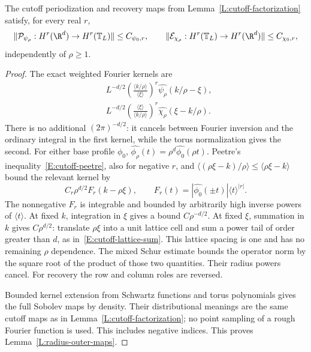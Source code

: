 \begin{lemma}\label{L:radius-outer-maps}
  The cutoff periodization and recovery maps from
  Lemma~\ref{L:cutoff-factorization} satisfy, for every real $r$,
  \[
    \|\mathcal P_{\psi_\rho}:H^r(\R^d)\to H^r(\mathbb T_L)\|
    \le C_{\psi_0,r},\qquad
    \|\mathcal E_{\chi_\rho}:H^r(\mathbb T_L)\to H^r(\R^d)\|
    \le C_{\chi_0,r},
  \]
  independently of $\rho\ge1$.
\end{lemma}

\begin{proof}
  The exact weighted Fourier kernels are
  \begin{align*}
    &L^{-d/2}
    \left(\frac{\langle k/\rho\rangle}{\langle\xi\rangle}\right)^r
    \widehat{\psi_\rho}(k/\rho-\xi),\\
    &L^{-d/2}
    \left(\frac{\langle\xi\rangle}{\langle k/\rho\rangle}\right)^r
    \widehat{\chi_\rho}(\xi-k/\rho).
  \end{align*}
  There is no additional $(2\pi)^{-d/2}$: it cancels between
  Fourier inversion and the ordinary integral in the first kernel,
  while the torus normalization gives the second.
  For either base profile $\phi_0$,
  $\widehat{\phi_\rho}(t)=\rho^d\widehat{\phi_0}(\rho t)$.
  Peetre's inequality~\eqref{E:cutoff-peetre}, also for negative $r$,
  and $\langle(\rho\xi-k)/\rho\rangle\le\langle\rho\xi-k\rangle$
  bound the relevant kernel by
  \[
    C_r\rho^{d/2}F_r(k-\rho\xi),\qquad
    F_r(t)=|\widehat{\phi_0}(\pm t)|\langle t\rangle^{|r|}.
  \]
  The nonnegative $F_r$ is integrable and bounded by arbitrarily
  high inverse powers of $\langle t\rangle$.
  At fixed $k$, integration in $\xi$ gives a bound $C\rho^{-d/2}$.
  At fixed $\xi$, summation in $k$ gives $C\rho^{d/2}$:
  translate $\rho\xi$ into a unit lattice cell and sum a power
  tail of order greater than $d$, as in~\eqref{E:cutoff-lattice-sum}.
  This lattice spacing is one and has no remaining $\rho$ dependence.
  The mixed Schur estimate bounds the operator norm by the square
  root of the product of those two quantities. Their radius powers
  cancel. For recovery the row and column roles are reversed.

  Bounded kernel extension from Schwartz functions and torus polynomials
  gives the full Sobolev maps by density.
  Their distributional meanings are the same cutoff maps as in
  Lemma~\ref{L:cutoff-factorization}; no point sampling of a rough
  Fourier function is used. This includes negative indices.
  This proves Lemma~\ref{L:radius-outer-maps}.
\end{proof}

